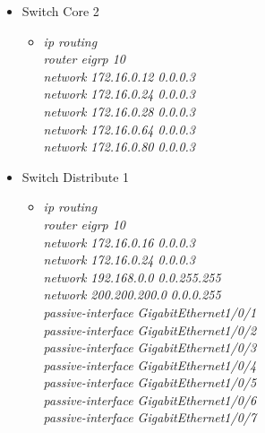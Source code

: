 \documentclass[12pt,a4paper]{report}
\begin{document}
\begin{itemize}
\begin{itemize}
\begin{itemize}
          \end{itemize}
             \item Switch Core 2
        \begin{itemize}
         \item \textit{ip routing\\
router eigrp 10\\
network 172.16.0.12 0.0.0.3 \\
network 172.16.0.24 0.0.0.3 \\
network 172.16.0.28 0.0.0.3 \\
network 172.16.0.64 0.0.0.3 \\
network 172.16.0.80 0.0.0.3\\}
         
          \end{itemize}
             \item Switch Distribute 1
        \begin{itemize}
         \item \textit{ip routing\\
router eigrp 10\\
network 172.16.0.16 0.0.0.3\\
network 172.16.0.24 0.0.0.3\\
network 192.168.0.0 0.0.255.255\\
network 200.200.200.0 0.0.0.255\\
passive-interface GigabitEthernet1/0/1\\
passive-interface GigabitEthernet1/0/2 \\
passive-interface GigabitEthernet1/0/3 \\
passive-interface GigabitEthernet1/0/4 \\
passive-interface GigabitEthernet1/0/5 \\
passive-interface GigabitEthernet1/0/6 \\
passive-interface GigabitEthernet1/0/7\\}
         

\end{itemize}
\end{itemize}
\end{itemize}
\end{document}
